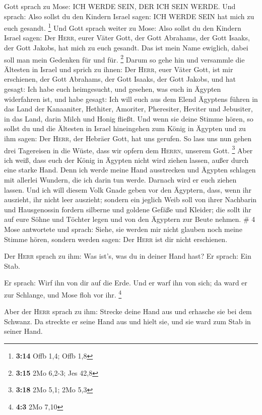  Gott sprach zu Mose: ICH WERDE SEIN, DER ICH SEIN WERDE.
Und sprach: Also sollst du den Kindern Israel sagen: ICH WERDE SEIN hat
mich zu euch gesandt. \footnote{\textbf{3:14} Offb 1,4; Offb 1,8}
 Und Gott sprach weiter zu Mose: Also sollst du den
Kindern Israel sagen: Der \textsc{Herr}, eurer Väter Gott, der Gott
Abrahams, der Gott Isaaks, der Gott Jakobs, hat mich zu euch gesandt.
Das ist mein Name ewiglich, dabei soll man mein Gedenken für und für.
\footnote{\textbf{3:15} 2Mo 6,2-3; Jes 42,8}  Darum so
gehe hin und versammle die Ältesten in Israel und sprich zu ihnen: Der
\textsc{Herr}, euer Väter Gott, ist mir erschienen, der Gott Abrahams,
der Gott Isaaks, der Gott Jakobs, und hat gesagt: Ich habe euch
heimgesucht, und gesehen, was euch in Ägypten widerfahren ist,
 und habe gesagt: Ich will euch aus dem Elend Ägyptens
führen in das Land der Kanaaniter, Hethiter, Amoriter, Pheresiter,
Heviter und Jebusiter, in das Land, darin Milch und Honig fließt.
 Und wenn sie deine Stimme hören, so sollst du und die
Ältesten in Israel hineingehen zum König in Ägypten und zu ihm sagen:
Der \textsc{Herr}, der Hebräer Gott, hat uns gerufen. So lass uns nun
gehen drei Tagereisen in die Wüste, dass wir opfern dem \textsc{Herrn},
unserem Gott. \footnote{\textbf{3:18} 2Mo 5,1; 2Mo 5,3} 
Aber ich weiß, dass euch der König in Ägypten nicht wird ziehen lassen,
außer durch eine starke Hand.  Denn ich werde meine Hand
ausstrecken und Ägypten schlagen mit allerlei Wundern, die ich darin tun
werde. Darnach wird er euch ziehen lassen.  Und ich will
diesem Volk Gnade geben vor den Ägyptern, dass, wenn ihr auszieht, ihr
nicht leer auszieht;  sondern ein jeglich Weib soll von
ihrer Nachbarin und Hausgenossin fordern silberne und goldene Gefäße und
Kleider; die sollt ihr auf eure Söhne und Töchter legen und von den
Ägyptern zur Beute nehmen. \# 4  Mose antwortete und
sprach: Siehe, sie werden mir nicht glauben noch meine Stimme hören,
sondern werden sagen: Der \textsc{Herr} ist dir nicht erschienen.

 Der \textsc{Herr} sprach zu ihm: Was ist's, was du in
deiner Hand hast? Er sprach: Ein Stab.

 Er sprach: Wirf ihn von dir auf die Erde. Und er warf ihn
von sich; da ward er zur Schlange, und Mose floh vor ihr. \footnote{\textbf{4:3}
  2Mo 7,10}

 Aber der \textsc{Herr} sprach zu ihm: Strecke deine Hand
aus und erhasche sie bei dem Schwanz. Da streckte er seine Hand aus und
hielt sie, und sie ward zum Stab in seiner Hand.

